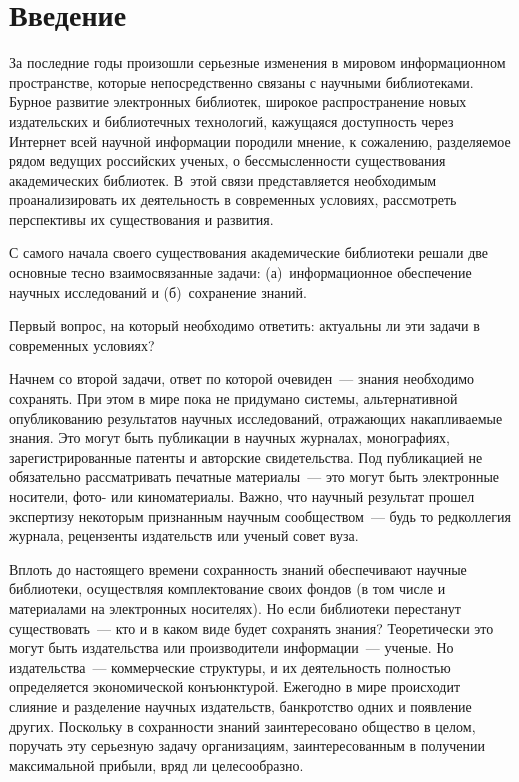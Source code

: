       \begin{multicols}{2}

            \label{st\stat}

\section{Введение}

   За последние годы произошли серьезные изменения в мировом информационном 
пространстве, которые непосредственно связаны с научными биб\-лио\-те\-ка\-ми. Бурное 
развитие электронных биб\-лио\-тек, широкое распространение новых издательских и 
биб\-лио\-теч\-ных технологий, кажущаяся доступность через Интернет всей научной 
информации породили мнение, к сожалению, раз\-де\-ля\-емое рядом ведущих российских 
ученых, о бес\-смыс\-лен\-ности существования академических биб\-лио\-тек. В~этой связи 
представляется необходимым проанализировать их деятельность в современных условиях, 
рассмотреть перспективы их существования и развития. 
   
   С самого начала своего существования академические биб\-лио\-те\-ки решали две 
основные тесно взаимосвязанные задачи: (а)~информационное обеспечение научных 
исследований и (б)~сохранение знаний. 
   
   Первый вопрос, на который необходимо ответить: актуальны ли эти задачи в 
современных условиях? 
   
   Начнем со второй задачи, ответ по которой очевиден~--- знания необходимо 
сохранять. При этом в мире пока не придумано системы, альтернативной опубликованию 
результатов научных исследований, отражающих накапливаемые знания. Это могут быть 
публикации в научных журналах, монографиях, зарегистрированные патенты и авторские 
свидетельства. Под публикацией не обязательно рассматривать печатные материалы~--- 
это могут быть электронные носители, фото- или киноматериалы. Важно, что научный 
результат прошел экспертизу некоторым признанным научным сообществом~--- будь то 
редколлегия журнала, рецензенты издательств или ученый совет вуза. 
   
   Вплоть до настоящего времени сохранность знаний обеспечивают научные 
биб\-лио\-те\-ки, осуществляя комплектование своих фондов (в том числе и материалами на 
электронных носителях). Но если библиотеки перестанут существовать~--- кто и в каком 
виде будет сохранять знания? Теоретически это могут быть издательства или 
производители информации~--- ученые. Но издательства~--- коммерческие структуры, и 
их деятельность полностью определяется экономической конъюнктурой. Ежегодно в мире 
происходит слияние и разделение научных издательств, банкротство одних и появление 
других. Поскольку в сохранности знаний заинтересовано общество в целом, поручать эту 
серьезную задачу организациям, заинтересованным в получении максимальной прибыли, 
вряд ли целесообразно. 


\end{multicols}
